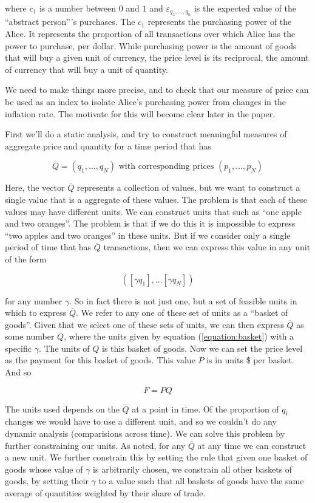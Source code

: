 where $c_1$ is a number between $0$ and $1$ and $\varepsilon_{q_1,\dots,q_n}$ is the expected value of
the ``abstract person'''s purchases. The $c_1$ represents the purchasing power of the Alice. It
represents the proportion of all transactions over which Alice has the power to purchase, per
dollar. While purchasing power is the amount of goods that will buy a given unit of currency, the
price level is its reciprocal, the amount of currency that will buy a unit of quantity.

We need to make things more precise, and to check that our measure of price can be used as an index
to isolate Alice's purchasing power from changes in the inflation rate. The motivate for this will
become clear later in the paper.

First we'll do a static analysis, and try to construct meaningful measures of aggregate price and
quantity for a time period that has 

\[
    \overline Q = \left( q_1, \dots, q_N \right) \textrm{ with corresponding prices } \left( p_1, \dots, p_N \right)
\]

Here, the vector $\overline Q$ represents a collection of values, but we want to construct a single
value that is a aggregate of these values. The problem is that each of these values may have
different units. We can construct units that such as ``one apple and two oranges''. The problem is
that if we do this it is impossible to express ``two apples and two oranges'' in these units. But if
we consider only a single period of time that has $\overline Q$ transactions, then we can express
this value in any unit of the form

\begin{equation}\label{equation:basket}
    \left( \left[ \gamma q_1 \right], \dots \left[ \gamma q_N \right] \right)
\end{equation}

for any number $\gamma$. So in fact there is not just one, but a set of feasible units in which to
express $\overline Q$. We refer to any one of these set of units as a ``basket of goods''. Given
that we select one of these sets of units, we can then express $\overline Q$ as some number $Q$,
where the units given by equation (\ref{equation:basket}) with a specific $\gamma$. The units of
$Q$ is this basket of goods. Now we can set the price level as the payment for this basket of goods.
This value $P$ is in units \$ per basket. And so

\[
    F = PQ
\]

The units used depends on the $\overline Q$ at a point in time. Of the proportion of $q_i$ changes
we would have to use a different unit, and so we couldn't do any dynamic analysis (comparisions
across time). We can solve this problem by further constraining our units. As noted, for any
$\overline Q$ at any time we can construct a new unit. We further constrain this by setting the rule
that given one basket of goods whose value of $\gamma$ is arbitrarily chosen, we constrain all other
baskets of goods, by setting their $\gamma$ to a value such that all baskets of goods have the same  
average of quantities weighted by their share of trade.

